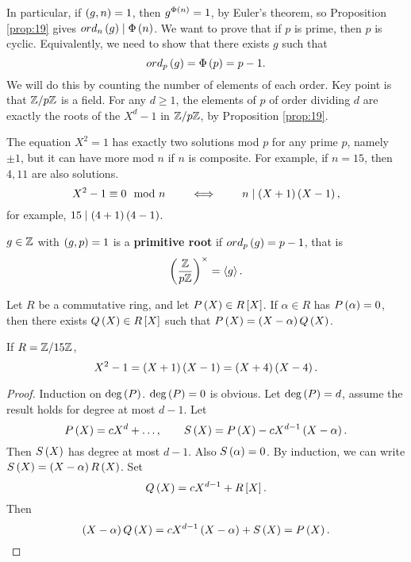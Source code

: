 In particular, if $ \left( g, n \right) = 1 $, then $ g^{\Phi\left( n \right)} = 1 $, by Euler's theorem, so Proposition \ref{prop:19} gives $ ord_n\left( g \right) \mid \Phi\left( n \right) $. We want to prove that if $ p $ is prime, then $ \unit{p} $ is cyclic. Equivalently, we need to show that there exists $ g $ such that
$$ ord_p\left( g \right) = \Phi\left( p \right) = p - 1. $$
We will do this by counting the number of elements of each order. Key point is that $ \mathbb{Z} / p\mathbb{Z} $ is a field. For any $ d \ge 1 $, the elements of $ \unit{p} $ of order dividing $ d $ are exactly the roots of the $ X^d - 1 $ in $ \mathbb{Z} / p\mathbb{Z} $, by Proposition \ref{prop:19}.

\begin{example2}
The equation $ X^2 = 1 $ has exactly two solutions mod $ p $ for any prime $ p $, namely $ \pm 1 $, but it can have more mod $ n $ if $ n $ is composite. For example, if $ n = 15 $, then $ 4, 11 $ are also solutions.
$$ X^2 - 1 \equiv 0 \mod n \qquad \iff \qquad n \mid \left( X + 1 \right)\left( X - 1 \right), $$
for example, $ 15 \mid \left( 4 + 1 \right)\left( 4 - 1 \right) $.
\end{example2}

\begin{definition}
$ g \in \mathbb{Z} $ with $ \left( g, p \right) = 1 $ is a \textbf{primitive root} if $ ord_p\left( g \right) = p - 1 $, that is
$$ \left( \dfrac{\mathbb{Z}}{p\mathbb{Z}} \right)^\times = \left\langle g \right\rangle. $$
\end{definition}

\begin{lemma}
\label{lem:21}
Let $ R $ be a commutative ring, and let $ P\left( X \right) \in R\left[ X \right] $. If $ \alpha \in R $ has $ P\left( \alpha \right) = 0 $, then there exists $ Q\left( X \right) \in R\left[ X \right] $ such that $ P\left( X \right) = \left( X - \alpha \right)Q\left( X \right) $.
\end{lemma}

\begin{example2}
If $ R = \mathbb{Z} / 15\mathbb{Z} $,
$$ X^2 - 1 = \left( X + 1 \right)\left( X - 1 \right) = \left( X + 4 \right)\left( X - 4 \right). $$
\end{example2}

\begin{proof}
Induction on $ \deg\left( P \right) $. $ \deg\left( P \right) = 0 $ is obvious. Let $ \deg\left( P \right) = d $, assume the result holds for degree at most $ d - 1 $. Let
$$ P\left( X \right) = cX^d + \dots, \qquad S\left( X \right) = P\left( X \right) - cX^{d - 1}\left( X - \alpha \right). $$
Then $ S\left( X \right) $ has degree at most $ d - 1 $. Also $ S\left( \alpha \right) = 0 $. By induction, we can write $ S\left( X \right) = \left( X - \alpha \right)R\left( X \right) $. Set
$$ Q\left( X \right) = cX^{d - 1} + R\left[ X \right]. $$
Then
$$ \left( X - \alpha \right)Q\left( X \right) = cX^{d - 1}\left( X - \alpha \right) + S\left( X \right) = P\left( X \right). $$
\end{proof}

